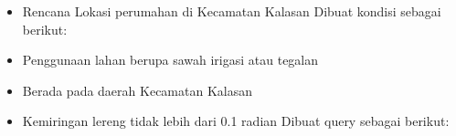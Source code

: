 \documentclass[letterpaper,10pt,english]{sphinxmanual}
\begin{document}
\begin{itemize}
\item {} 
Rencana Lokasi perumahan di Kecamatan Kalasan
Dibuat kondisi sebagai berikut:

\end{itemize}
\begin{itemize}
\item {} 
Penggunaan lahan berupa sawah irigasi atau tegalan

\item {} 
Berada pada daerah Kecamatan Kalasan

\item {} 
Kemiringan lereng tidak lebih dari 0.1 radian
Dibuat query sebagai berikut:

\end{itemize}
\end{document}

